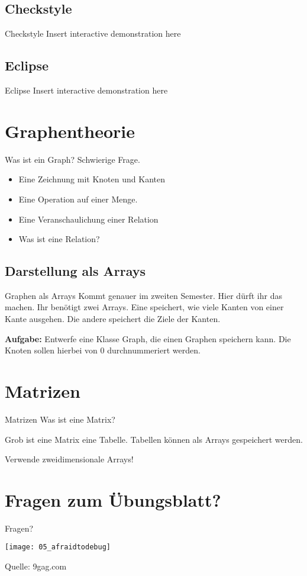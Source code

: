 \documentclass[18pt]{beamer}
\begin{document}
\subsection{Checkstyle}
\begin{frame}{Checkstyle}
 Insert interactive demonstration here
\end{frame}
\subsection{Eclipse}
\begin{frame}{Eclipse}
 Insert interactive demonstration here
\end{frame}
\section{Graphentheorie}
\begin{frame}{Was ist ein Graph?}
 Schwierige Frage.
 \begin{itemize}
  \item Eine Zeichnung mit Knoten und Kanten \pause
  \item Eine Operation auf einer Menge. \pause
  \item Eine Veranschaulichung einer Relation \pause
  \item Was ist eine Relation?
 \end{itemize}
\end{frame}

\subsection{Darstellung als Arrays}
\begin{frame}{Graphen als Arrays}
Kommt genauer im zweiten Semester. Hier dürft ihr das machen.
Ihr benötigt zwei Arrays. Eine speichert, wie viele Kanten von einer
Kante ausgehen. Die andere speichert die Ziele der Kanten.

\textbf{Aufgabe:} Entwerfe eine Klasse Graph, die einen Graphen speichern
kann. Die Knoten sollen hierbei von 0 durchnummeriert werden.
\end{frame}

\section{Matrizen}
\begin{frame}{Matrizen}
 Was ist eine Matrix? \pause
 
 Grob ist eine Matrix eine Tabelle. 
 Tabellen können als Arrays gespeichert werden. 
 
 \pause
 Verwende zweidimensionale Arrays!
\end{frame}
\section{Fragen zum Übungsblatt?}
\begin{frame}{Fragen?}
\end{frame}



\begin{frame}
 \texttt{[image: 05\_afraidtodebug]}
 
 \tiny{Quelle: 9gag.com}
\end{frame}
\end{document}
